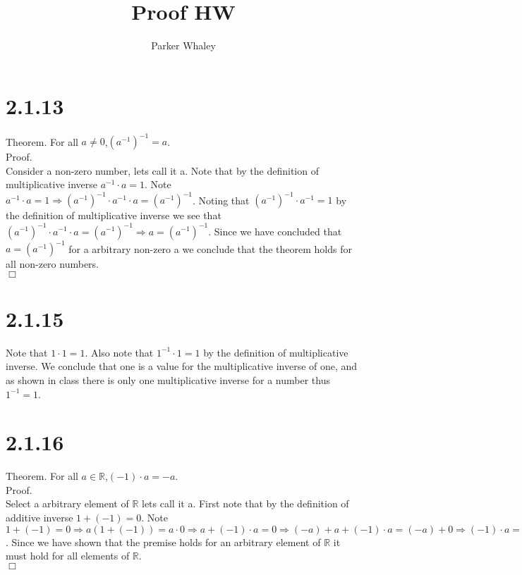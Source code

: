 \documentclass[12pt,a4paper]{article}
\author{Parker Whaley}
\title{Proof HW}
\begin{document}
\maketitle
\section{2.1.13}
Theorem.  For all $a\neq 0$,$(a^{-1})^{-1}=a$.\\
Proof.\\
Consider a non-zero number, lets call it a.  Note that by the definition of multiplicative inverse $a^{-1}\cdot a=1$.  Note $a^{-1}\cdot a=1\Rightarrow (a^{-1})^{-1}\cdot a^{-1}\cdot a=(a^{-1})^{-1}$.  Noting that $(a^{-1})^{-1}\cdot a^{-1}=1$ by the definition of multiplicative inverse we see that $(a^{-1})^{-1}\cdot a^{-1}\cdot a=(a^{-1})^{-1}\Rightarrow  a=(a^{-1})^{-1}$.  Since we have concluded that $a=(a^{-1})^{-1}$ for a arbitrary non-zero a we conclude that the theorem holds for all non-zero numbers.\\$\Box$
\section{2.1.15}
Note that $1\cdot 1=1$.  Also note that $1^{-1}\cdot 1=1$ by the definition of multiplicative inverse.  We conclude that one is a value for the multiplicative inverse of one, and as shown in class there is only one multiplicative inverse for a number thus $1^{-1}=1$.
\section{2.1.16}
Theorem.  For all $a\in \mathbb{R}$,$(-1)\cdot a=-a$.\\
Proof.\\
Select a arbitrary element of $\mathbb{R}$ lets call it a.  First note that by the definition of additive inverse $1+(-1)=0$.  Note $1+(-1)=0 \Rightarrow a(1+(-1))=a\cdot 0 \Rightarrow a+(-1)\cdot a=0 \Rightarrow (-a)+a+(-1)\cdot a=(-a)+0 \Rightarrow (-1)\cdot a=(-a)$.  Since we have shown that the premise holds for an arbitrary element of $\mathbb{R}$ it must hold for all elements of $\mathbb{R}$.\\$\Box$
\end{document}
